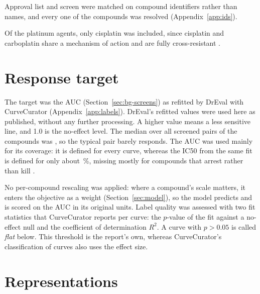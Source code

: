 Approval list and screen were matched on compound identifiers rather than names, and every one of
the \NDrugs{} compounds was resolved (Appendix~\ref{app:ids}).

Of the platinum agents, only cisplatin was included, since cisplatin and carboplatin share a mechanism
of action and are fully cross-resistant \cite{rabik2007}.


\section{Response target}
\label{sec:target}

The target was the AUC (Section~\ref{sec:bg-screens}) as refitted by DrEval with CurveCurator
\cite{dreval,bayer2023curvecurator} (Appendix~\ref{app:labels}). DrEval's refitted values were used here as published, without any
further processing. A higher value means
a less sensitive line, and 1.0 is the no-effect level. The median over all screened pairs of the
\NDrugsModelled{} compounds was \AucMedian{}, so the typical pair barely responds. The AUC was used mainly for its coverage: it is defined for every
curve, whereas the IC50 from the same fit is defined for only about \IcDefinedPct\,\%, missing mostly for compounds
that arrest rather than kill \cite{dreval,bayer2023curvecurator}.

No per-compound rescaling was applied: where a compound's scale matters, it enters the objective as a
weight (Section~\ref{sec:model}), so the model predicts and is scored on the AUC in its original units.
Label quality was assessed with two fit statistics that CurveCurator reports per curve: the $p$-value of
the fit against a no-effect null \cite{bayer2023curvecurator} and the coefficient of determination $R^2$.
A curve with $p > 0.05$ is called \emph{flat} below. This threshold is the report's own, whereas
CurveCurator's classification of curves also uses the effect size.

\section{Representations}
\label{sec:representations}

